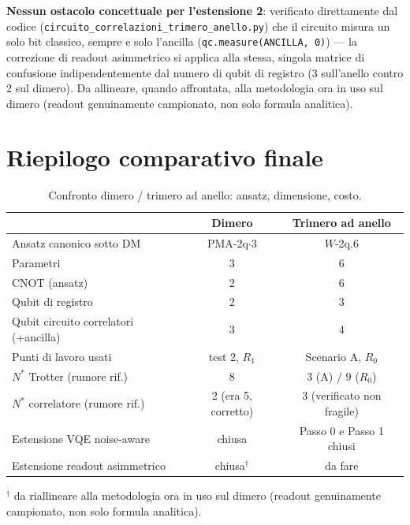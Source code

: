 \documentclass[11pt,a4paper]{article}
\begin{document}

\textbf{Nessun ostacolo concettuale per l'estensione 2}: verificato
direttamente dal codice (\texttt{circuito\_correlazioni\_trimero\_anello.py})
che il circuito misura un solo bit classico, sempre e solo l'ancilla
(\texttt{qc.measure(ANCILLA, 0)}) --- la correzione di readout asimmetrico si
applica alla stessa, singola matrice di confusione indipendentemente dal
numero di qubit di registro (3 sull'anello contro 2 sul dimero). Da
allineare, quando affrontata, alla metodologia ora in uso sul dimero
(readout genuinamente campionato, non solo formula analitica).

\section{Riepilogo comparativo finale}

\begin{table}[htbp]
\centering
\caption{Confronto dimero / trimero ad anello: ansatz, dimensione, costo.}
\label{tab:confronto-finale}
\begin{tabular}{lcc}
\toprule
& Dimero & Trimero ad anello \\
\midrule
Ansatz canonico sotto DM & PMA-2q$\cdot$3 & $W$-2q.6 \\
Parametri & 3 & 6 \\
CNOT (ansatz) & 2 & 6 \\
Qubit di registro & 2 & 3 \\
Qubit circuito correlatori (+ancilla) & 3 & 4 \\
Punti di lavoro usati & test 2, $R_1$ & Scenario A, $R_0$ \\
$N^*$ Trotter (rumore rif.) & 8 & $3$ (A) / $9$ ($R_0$) \\
$N^*$ correlatore (rumore rif.) & 2 (era 5, corretto) & 3 (verificato non fragile) \\
Estensione VQE noise-aware & chiusa & Passo 0 e Passo 1 chiusi \\
Estensione readout asimmetrico & chiusa$^\dagger$ & da fare \\
\bottomrule
\end{tabular}

\vspace{2pt}
{\footnotesize $^\dagger$ da riallineare alla metodologia ora in uso sul
dimero (readout genuinamente campionato, non solo formula analitica).}
\end{table}
\end{document}
